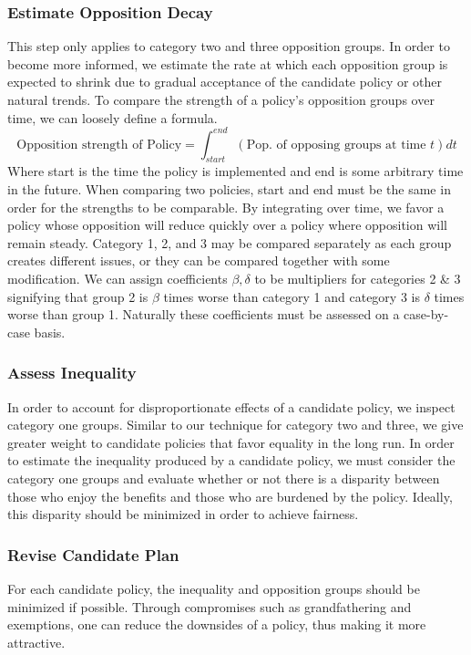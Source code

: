 \documentclass[a4paper,12pt]{article}
\begin{document}
\subsubsection{Estimate Opposition Decay}
This step only applies to category two and three opposition groups.
In order to become more informed, we estimate the rate at which each opposition group is expected to shrink due to gradual acceptance of the candidate policy or other natural trends.
To compare the strength of a policy's opposition groups over time, we can loosely define a formula.
$$\textrm{Opposition strength of Policy} = \int_{start}^{end} (\textrm{Pop.\ of opposing groups at time }t) dt$$
Where start is the time the policy is implemented and end is some arbitrary time in the future.
When comparing two policies, start and end must be the same in order for the strengths to be comparable.
By integrating over time, we favor a policy whose opposition will reduce quickly over a policy where opposition will remain steady.
Category 1, 2, and 3 may be compared separately as each group creates different issues, or they can be compared together with some modification.
We can assign coefficients $\beta, \delta$ to be multipliers for categories 2 \& 3 signifying that group 2 is $\beta$ times worse than category 1 and category 3 is $\delta$ times worse than group 1.
Naturally these coefficients must be assessed on a case-by-case basis.

\subsubsection{Assess Inequality}
In order to account for disproportionate effects of a candidate policy, we inspect category one groups.
Similar to our technique for category two and three, we give greater weight to candidate policies that favor equality in the long run.
In order to estimate the inequality produced by a candidate policy, we must consider the category one groups and evaluate whether or not there is a disparity between those who enjoy the benefits and those who are burdened by the policy.
Ideally, this disparity should be minimized in order to achieve fairness.

\subsubsection{Revise Candidate Plan}
For each candidate policy, the inequality and opposition groups should be minimized if possible.
Through compromises such as grandfathering and exemptions, one can reduce the downsides of a policy, thus making it more attractive.
\end{document}
